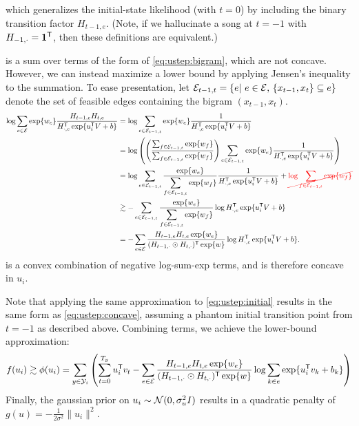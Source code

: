 \documentclass{article}
\newcommand{\ccancel}[2][black]{\color{#1}\cancel{#2}\normalcolor}
\def\E{\ensuremath{\mathcal{E}}}
\begin{document}
which generalizes the initial-state likelihood (with $t=0$) by including the binary transition factor $H_{t-1,e}$.  
(Note, if we hallucinate a song at $t=-1$ with $H_{-1,\cdot} = \mathbf{1}^\mathsf{T}$, then these definitions are equivalent.)

 is a sum over terms of the form of \cref{eq:ustep:bigram}, which are not concave.  However, we can instead maximize a lower bound by applying Jensen's inequality to
the summation.  To ease presentation, let ${\E_{t-1,t} = \{e \given e \in \E,\, \{x_{t-1}, x_{t}\} \subseteq e\}}$ denote the set of feasible edges containing the bigram $(x_{t-1}, x_t)$.
\begin{align}
\log\sum_{e\in \E} \exp\{w_e\} \frac{H_{t-1,e} H_{t, e} }{H_{\cdot,e}\trans \exp\{u_i\trans V + b \} }
&= \log\sum_{e \in \E_{t-1,t}} \exp\{w_e\} \frac{1}{H_{\cdot, e}\trans \exp\{u_i\trans V + b\} }\notag\\
&= \log\left( \left(\frac{\sum_{f \in \E_{t-1,t}} \exp\{w_f\}}{\sum_{f \in \E_{t-1,t}}
\exp\{w_f\}} \right) \sum_{e \in \E_{t-1,t}} \exp\{w_e\} \frac{1}{H_{\cdot, e}\trans
\exp\{u_i\trans V + b\} }\right)\notag\\
&= \log\sum_{e \in \E_{t-1,t}} \frac{\exp\{w_e\}}{\displaystyle\sum_{f\in\E_{t-1,t}} \exp\{w_f\}} \frac{1}{H_{\cdot, e}\trans \exp\{u_i\trans V + b\} } + \ccancel[red]{\log \sum_{f \in \E_{t-1,t}} \exp\{w_f\}}\notag\\
&\gtrsim -\sum_{e \in \E_{t-1,t}} \frac{\exp\{w_e\}}{\displaystyle\sum_{f\in\E_{t-1,t}} \exp\{w_f\}} \log H_{\cdot, e}\trans \exp\{u_i\trans V + b\}  \notag\\
&= -\sum_{e\in\E} \frac{H_{t-1,e} H_{t,e} \exp\{w_e\}}{ (H_{t-1,\cdot} \odot H_{t,\cdot})\trans \exp\{w\}} \log H_{\cdot, e}\trans \exp\{u_i\trans V + b\}  \label{eq:ustep:concave}.
\end{align}
 is a convex combination of negative log-sum-exp terms, and is therefore concave in $u_i$.  

Note that applying the same approximation to \cref{eq:ustep:initial} results in the same form as \cref{eq:ustep:concave}, assuming a phantom initial transition point from $t=-1$ 
as described above.  Combining terms, we achieve the lower-bound approximation:
\begin{equation}
f(u_i) \gtrsim \phi(u_i) = \sum_{y \in \Y_i} \left(\sum_{t=0}^{T_y} u_i\trans v_t - \sum_{e \in \E} \frac{H_{t-1,e} H_{t,e} \exp\{w_e\}}{ (H_{t-1,\cdot}\odot H_{t,\cdot})\trans \exp\{w\}} \log
\sum_{k\in e} \exp\{u_i\trans v_k + b_k\} \right)\label{eq:ustep:concave_obj}
\end{equation}
Finally, the gaussian prior on $u_i \sim \mathcal{N}(0, \sigma_u^2 I)$ results in a quadratic penalty of $g(u) = -\frac{1}{2\sigma^2}\|u_i\|^2$.
\end{document}

